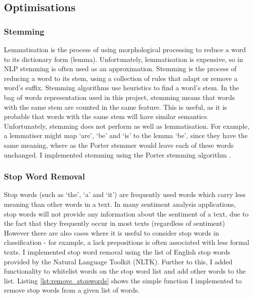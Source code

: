 \documentclass[12pt,a4paper,twoside,openright]{report}
\newcommand{\mylisting}[4]{}
\newcommand{\pylisting}[2]{\mylisting{Python}{py}{#1}{#2}}
\begin{document}
\subsection{Optimisations}

\subsubsection{Stemming}

Lemmatisation is the process of using morphological processing to reduce a word to its dictionary form (lemma). Unfortunately, lemmatisation is expensive, so in NLP stemming is often used as an approximation. Stemming is the process of reducing a word to its stem, using a collection of rules that adapt or remove a word's suffix. Stemming algorithms use heuristics to find a word's stem. In the bag of words representation used in this project, stemming means that words with the same stem are counted in the same feature. This is useful, as it is probable that words with the same stem will have similar semantics. Unfortunately, stemming does not perform as well as lemmatisation. For example, a lemmatiser might map `are', `be' and `is' to the lemma `be', since they have the same meaning, where as the Porter stemmer would leave each of these words unchanged. I implemented stemming using the Porter stemming algorithm \cite{porter1980algorithm}.

\subsubsection{Stop Word Removal}

Stop words (such as `the', `a' and `it') are frequently used words which carry less meaning than other words in a text. In many sentiment analysis applications, stop words will not provide any information about the sentiment of a text, due to the fact that they frequently occur in most texts (regardless of sentiment) However there are also cases where it is useful to consider stop words in classification - for example, a lack prepositions is often associated with less formal texts. I implemented stop word removal using the list of English stop words provided by the Natural Language Toolkit (NLTK). Further to this, I added functionality to whitelist words on the stop word list and add other words to the list. Listing \ref{lst:remove_stopwords} shows the simple function I implemented to remove stop words from a given list of words.

\pylisting{A function which removes the stop words and words on from a given list of words.}{remove_stopwords}
\end{document}

